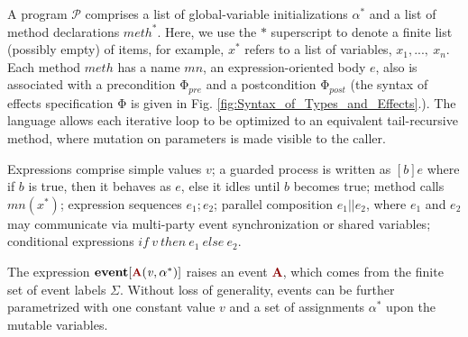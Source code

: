 \documentclass[acmsmall,10pt,review]{acmart}
\newcommand{\effect}{{\ensuremath{\mathrm{\Phi}}}}
\newcommand{\anyevent}[1]{{\textcolor{darkred}
{{\textbf{\small #1}}}}}
\newcommand{\code}[1]{{\tt{\ensuremath{\m{#1}}}}}
\newcommand{\m}{\mathit}
\newcommand\figref[1]{Fig. \textcolor{black}{\ref{#1}}.}
\begin{document}
{A program \code{\mathcal{P}} comprises a list of 
global-variable initializations \code{\alpha^*} and 
a list of 
method declarations \code{{meth^*}}. 
Here, we use the \code{*} superscript to denote a finite list (possibly empty) of items, for example, \code{{x^*}} refers to a list of variables, \code{x_1, ...,\ x_n}. 
Each method \code{meth} has a name \code{mn}, an expression-oriented body \code{e}, also is associated with a precondition  \code{\effect_{pre}} and a postcondition \code{\effect_{post}} (the syntax of effects specification \code{\effect} is given in \figref{fig:Syntax_of_Types_and_Effects}).
The language allows each iterative loop to be optimized to an equivalent 
tail-recursive method, where mutation on parameters is made visible 
to the caller. 

Expressions comprise simple values \code{v};
a guarded process is written as \code{[b]e} where if \code{b} is true, 
then it behaves as \code{e}, else it idles until \code{b} becomes true; 
method calls \code{mn({x^*})}; 
expression sequences \code{e_1;e_2};
parallel composition \code{e_1 || e_2}, where \code{e_1} and \code{e_2} 
may communicate via multi-party event synchronization or shared variables; 
conditional expressions \code{{if}\ v\ {then}\ e_1\ {else}\ e_2}. 

The expression \code{ \textbf{event} [\anyevent{A}(v,  \alpha^*)] } 
raises an event \anyevent{A}, which comes from the finite 
set of event labels \code{\Sigma}. %
Without loss of generality, events can be further parametrized with 
one constant value \code{v} and a set of assignments \code{\alpha^*} upon 
the mutable variables. %



}
\end{document}

